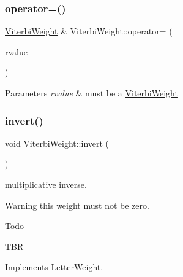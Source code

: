 \subsubsection{\texorpdfstring{operator=()}{operator=()}\hspace{0.1cm}{\footnotesize\ttfamily [4/4]}}
{\footnotesize\ttfamily \mbox{\hyperlink{classViterbiWeight}{Viterbi\+Weight}} \& Viterbi\+Weight\+::operator= (\begin{DoxyParamCaption}\item[{const \mbox{\hyperlink{classLetterWeight}{Letter\+Weight}} \&}]{rvalue }\end{DoxyParamCaption})}


\begin{DoxyParams}{Parameters}
{\em rvalue} & must be a \mbox{\hyperlink{classViterbiWeight}{Viterbi\+Weight}} \\
\hline
\end{DoxyParams}
\mbox{\label{group__weight_ga1fa4dd503a5f4915df2f9c5663aeeaeb}} 
\subsubsection{\texorpdfstring{invert()}{invert()}\hspace{0.1cm}{\footnotesize\ttfamily [3/4]}}
{\footnotesize\ttfamily void Viterbi\+Weight\+::invert (\begin{DoxyParamCaption}{ }\end{DoxyParamCaption})\hspace{0.3cm}{\ttfamily [virtual]}}



multiplicative inverse. 

\begin{DoxyWarning}{Warning}
this weight must not be zero. 
\end{DoxyWarning}
\begin{DoxyRefDesc}{Todo}
\item[\mbox{\hyperlink{todo__todo000039}{Todo}}]T\+BR \end{DoxyRefDesc}


Implements \mbox{\hyperlink{classLetterWeight_a76a013deb82c8c1511cb6a68e5a06218}{Letter\+Weight}}.

\mbox{\label{group__weight_ga009b0216c58308f81497e4aabe49aaed}} 
